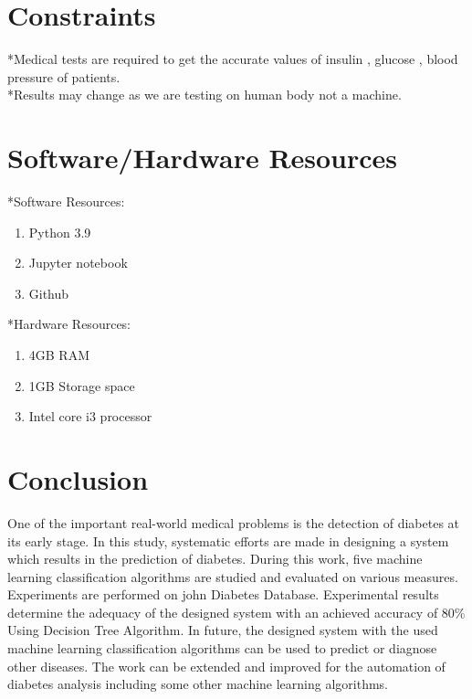 \documentclass[pdftex,a4paper,11pt,oneside,openright]{report}
\begin{document}
\chapter{Constraints}
\Large{*Medical tests are required to get the accurate values of insulin , glucose , blood pressure of patients.}\\
\Large{*Results may change as we are testing on human body not a machine.}

\chapter{Software/Hardware Resources}
\Large{*Software Resources:}
\begin{enumerate}
    \item Python 3.9
    \item Jupyter notebook
    \item Github
\end{enumerate}
\Large{*Hardware Resources:}
\begin{enumerate}
    \item 4GB RAM
    \item 1GB Storage space
    \item Intel core i3 processor
\end{enumerate}

\chapter{Conclusion}
\Large{One of the important real-world medical problems is the detection of diabetes at its early stage. In this study, systematic efforts are made in designing a system which results in the prediction of diabetes. During this work, five machine learning classification algorithms are studied and evaluated on various measures. Experiments are performed on john Diabetes Database. Experimental results determine the adequacy of the designed system with an achieved accuracy of 80\% Using Decision Tree Algorithm. In future, the designed system with the used machine learning classification algorithms can be used to predict or diagnose other diseases. The work can be extended and improved for the automation of diabetes analysis including some other machine learning algorithms. }

\end{document}
